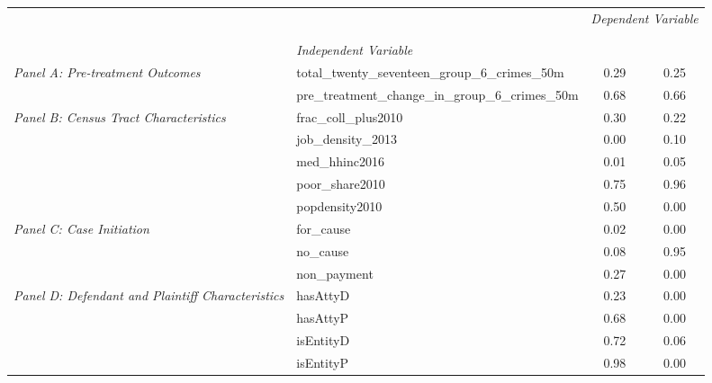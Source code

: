 \begin{tabular}{llcc}
\toprule
 &  & \multicolumn{2}{c}{\textit{Dependent Variable}} \\
\cline{3-4}
\\
 &  &  &  \\
 & \emph{Independent Variable} &  &  \\
\midrule
\multirow[c]{2}{3cm}{\textit{Panel A: Pre-treatment Outcomes}} & total_twenty_seventeen_group_6_crimes_50m & 0.29 & 0.25 \\
 & pre_treatment_change_in_group_6_crimes_50m & 0.68 & 0.66 \\
\cline{1-4}
\multirow[c]{5}{3cm}{\textit{Panel B: Census Tract Characteristics}} & frac_coll_plus2010 & 0.30 & 0.22 \\
 & job_density_2013 & 0.00 & 0.10 \\
 & med_hhinc2016 & 0.01 & 0.05 \\
 & poor_share2010 & 0.75 & 0.96 \\
 & popdensity2010 & 0.50 & 0.00 \\
\cline{1-4}
\multirow[c]{3}{3cm}{\textit{Panel C: Case Initiation}} & for_cause & 0.02 & 0.00 \\
 & no_cause & 0.08 & 0.95 \\
 & non_payment & 0.27 & 0.00 \\
\cline{1-4}
\multirow[c]{4}{3cm}{\textit{Panel D: Defendant and Plaintiff Characteristics}} & hasAttyD & 0.23 & 0.00 \\
 & hasAttyP & 0.68 & 0.00 \\
 & isEntityD & 0.72 & 0.06 \\
 & isEntityP & 0.98 & 0.00 \\
\cline{1-4}
\bottomrule
\end{tabular}
